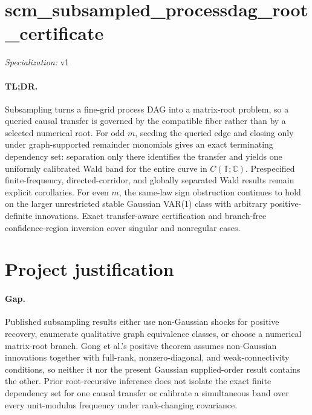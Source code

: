 \documentclass{article}
\begin{document}
\sloppy

\section*{scm\_\allowbreak{}subsampled\_\allowbreak{}processdag\_\allowbreak{}root\_\allowbreak{}certificate}

\noindent\textit{Specialization:} v1\par

\paragraph{TL;DR.} Subsampling turns a fine-grid process DAG into a matrix-root problem, so a queried causal transfer is governed by the compatible fiber rather than by a selected numerical root.  For odd \(m\), seeding the queried edge and closing only under graph-supported remainder monomials gives an exact terminating dependency set: separation only there identifies the transfer and yields one uniformly calibrated Wald band for the entire curve in \(C(\mathbb T;\mathbb C)\).  Prespecified finite-frequency, directed-corridor, and globally separated Wald results remain explicit corollaries.  For even \(m\), the same-law sign obstruction continues to hold on the larger unrestricted stable Gaussian VAR(1) class with arbitrary positive-definite innovations.  Exact transfer-aware certification and branch-free confidence-region inversion cover singular and nonregular cases.

\section{Project justification}

\paragraph{Gap.} Published subsampling results either use non-Gaussian shocks for positive recovery, enumerate qualitative graph equivalence classes, or choose a numerical matrix-root branch.  Gong et al.'s positive theorem assumes non-Gaussian innovations together with full-rank, nonzero-diagonal, and weak-connectivity conditions, so neither it nor the present Gaussian supplied-order result contains the other.  Prior root-recursive inference does not isolate the exact finite dependency set for one causal transfer or calibrate a simultaneous band over every unit-modulus frequency under rank-changing covariance.
\end{document}
